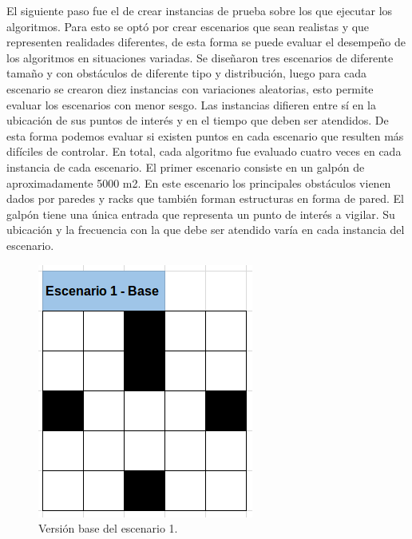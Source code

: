 El siguiente paso fue el de crear instancias de prueba sobre los que ejecutar los algoritmos. Para esto se optó por crear escenarios que sean realistas y que representen realidades diferentes, de esta forma se puede evaluar el desempeño de los algoritmos en situaciones variadas. Se diseñaron tres escenarios de diferente tamaño y con obstáculos de diferente tipo y distribución, luego para cada escenario se crearon diez instancias con variaciones aleatorias, esto permite evaluar los escenarios con menor sesgo. Las instancias difieren entre sí en la ubicación de sus puntos de interés y en el tiempo que deben ser atendidos. De esta forma podemos evaluar si existen puntos en cada escenario que resulten más difíciles de controlar. En total, cada algoritmo fue evaluado cuatro veces en cada instancia de cada escenario.
El primer escenario consiste en un galpón de aproximadamente 5000 m2. En este escenario los principales obstáculos vienen dados por paredes y racks que también forman estructuras en forma de pared. El galpón tiene una única entrada que representa un punto de interés a vigilar. Su ubicación y la frecuencia con la que debe ser atendido varía en cada instancia del escenario.

\begin{figure}[h!]
	\label{fig:comp}
	\includegraphics[width=.8\textwidth]{imagenes/chap6/image1}
	\caption{Versión base del escenario 1.}
\end{figure}

